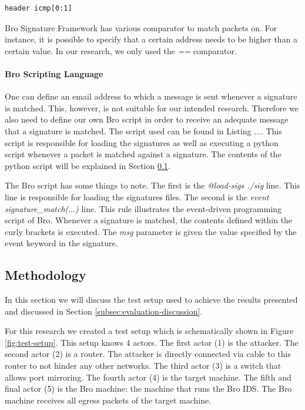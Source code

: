 \begin{lstlisting}[caption={Bro Signature header condition}, label={lst:header-condition}]
header icmp[0:1]
\end{lstlisting} 

Bro Signature Framework has various comparator to match packets on. For instance, it is possible to specify that a certain address needs to be higher than a certain value. In our research, we only used the \emph{==} comparator.

   



\paragraph{Bro Scripting Language}
One can define an email address to which a message is sent whenever a signature is matched. This, however, is not suitable for our intended research. Therefore we also need to define our own Bro script in order to receive an adequate message that a signature is matched. The script used can be found in Listing $\dots$. This script is responsible for loading the signatures as well as executing a python script whenever a packet is matched against a signature. The contents of the python script will be explained in Section \ref{subsec:methodology}. 

The Bro script has some things to note. The first is the \emph{@load-sigs ./sig} line. This line is responsible for loading the signatures files. The second is the \emph{event signature\_match($\dots$)} line. This rule illustrates the event-driven programming script of Bro. Whenever a signature is matched, the contents defined within the curly brackets is executed. The \emph{msg} parameter is given the value specified by the event keyword in the signature.  




\subsection{Methodology}\label{subsec:methodology}
In this section we will discuss the test setup used to achieve the results presented and discussed in Section \ref{subsec:evaluation-discussion}.

For this research we created a test setup which is schematically shown in Figure \ref{fig:test-setup}. This setup knows 4 actors. The first actor (1) is the attacker. The second actor (2) is a router. The attacker is directly connected via cable to this router to not hinder any other networks. The third actor (3) is a switch that allows port mirroring. The fourth actor (4) is the target machine. The fifth and final actor (5) is the Bro machine: the machine that runs the Bro IDS. The Bro machine receives all egress packets of the target machine. 


